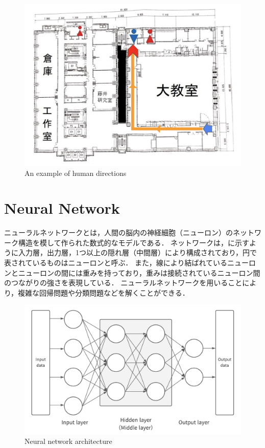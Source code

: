 \documentclass[../main]{subfiles}
\begin{document}
        
         \begin{figure}[H]
          \centering
          \includegraphics[width=12cm]{../images/scenario_fig}
          \caption{An example of human directions}
          \label{figure::scenario_exp}
         \end{figure}

         \newpage
          
        \section{Neural Network}
        ニューラルネットワークとは，人間の脳内の神経細胞（ニューロン）のネットワーク構造を模して作られた数式的なモデルである．
        ネットワークは，に示すように入力層，出力層，1つ以上の隠れ層（中間層）により構成されており，円で表されているものはニューロンと呼ぶ．
        また，線により結ばれているニューロンとニューロンの間には重みを持っており，重みは接続されているニューロン間のつながりの強さを表現している．
        ニューラルネットワークを用いることにより，複雑な回帰問題や分類問題などを解くことができる．
        \begin{figure}[H]
         \centering
         \includegraphics[width=12cm]{../images/NN.png}
         \caption{Neural network architecture}
         \label{figure::NN}
        \end{figure}
\end{document}
